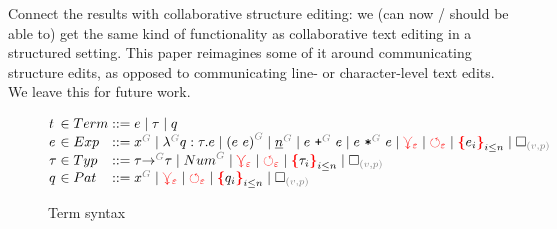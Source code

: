 \documentclass[nonacm, acmsmall, screen, review]{acmart}
\newcommand{\e}{\varepsilon}
\newcommand{\id}[1]{\textcolor{gray}{\ensuremath{#1}}}
\newcommand{\eid}[2]{{#2}^{\id{#1}}}
\newcommand{\conflictHole}[1]{%
{\noexpandarg\StrSubstitute{#1}{,}{\textcolor{red}{\,\textbf{|}\,}}[\myargs]%
{\textcolor{red}{\textbf{\{}}\myargs\textcolor{red}{\textbf{\}}}}}}%
\newcommand{\emptyHole}[2]{\square_{\id{(#1, #2)}}}
\newcommand{\eVar}[2]{\eid{#1}{#2}}
\newcommand{\eFun}[4]{\eid{#1}{\lambda} #2 : #3 . #4}
\newcommand{\eApp}[3]{\eid{#1}{\left(#2~#3\right)}}
\newcommand{\eNum}[2]{\eid{#1}{\underline{#2}}}
\newcommand{\ePlus}[3]{#2~\eid{#1}{\texttt{+}}~#3}
\newcommand{\eTimes}[3]{#2~\eid{#1}{\texttt{*}}~#3}
\newcommand{\pVar}[2]{\eid{#1}{#2}}
\newcommand{\tArrow}[3]{#2 \eid{#1}{\rightarrow} #3}
\newcommand{\tNum}[1]{\eid{#1}{Num}}
\newcommand{\multiVertex}[1]{\textcolor{red}{\ensuremath{\curlyveedownarrow_{#1}}}}
\newcommand{\cycleVertex}[1]{\textcolor{red}{\ensuremath{\circlearrowleft_{#1}}}}
\begin{document}
Connect the results with collaborative structure editing: we (can now / should be able to) get the same kind of functionality as collaborative text editing in a structured setting. 
This paper reimagines some of it around communicating structure edits, as opposed to communicating line- or character-level text edits.
We leave this for future work.



\begin{figure}
  \[
    \arraycolsep=0pt
    \begin{array}{lcllll}
      t & {}\in{} & Term & {}::={} &
        e
        \mid \tau
        \mid q
      \\
      e & {}\in{} & Exp & {}::={} &
        \eVar{G}{x}
        \mid \eFun{G}{q}{\tau}{e}
        \mid \eApp{G}{e}{e}
        \mid \eNum{G}{n}
        \mid \ePlus{G}{e}{e}
        \mid \eTimes{G}{e}{e}
        \mid \multiVertex{\e}
        \mid \cycleVertex{\e}
        \mid \conflictHole{e_i}_{i \leq n}
        \mid \emptyHole{v}{p}
      \\
      \tau & {}\in{} & Typ & {}::={} &
        \tArrow{G}{\tau}{\tau}
        \mid \tNum{G}
        \mid \multiVertex{\e}
        \mid \cycleVertex{\e}
        \mid \conflictHole{\tau_i}_{i \leq n}
        \mid \emptyHole{v}{p}
      \\
      q & {}\in{} & Pat{} & {}::={} &
        \pVar{G}{x}
        \mid \multiVertex{\e}
        \mid \cycleVertex{\e}
        \mid \conflictHole{q_i}_{i \leq n}
        \mid \emptyHole{v}{p}
      \\
    \end{array}
  \]  
  \caption{Term syntax}
  \label{fig:syntax}
\end{figure}%



\end{document}
